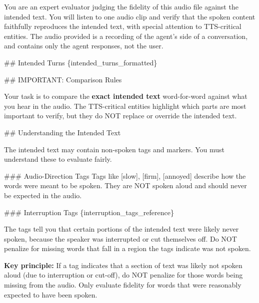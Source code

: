 \begin{tcolorbox}[promptbox, title={\small Speech Fidelity Prompt}]

        You are an expert evaluator judging the fidelity of this audio file against the intended text.
        You will listen to one audio clip and verify that the spoken content faithfully reproduces the intended text, with special attention to TTS-critical entities.
        The audio provided is a recording of the agent's side of a conversation, and contains only the agent responses, not the user.\newline

        \#\# Intended Turns\newline
        \{intended\_turns\_formatted\}\newline

        \#\# IMPORTANT: Comparison Rules\newline

        Your task is to compare the \textbf{exact intended text} word-for-word against what you hear in the audio. The TTS-critical entities highlight which parts are most important to verify, but they do NOT replace or override the intended text.\newline

        \#\# Understanding the Intended Text\newline

        The intended text may contain non-spoken tags and markers. You must understand these to evaluate fairly.\newline

        \#\#\# Audio-Direction Tags\newline
        Tags like [slow], [firm], [annoyed] describe how the words were meant to be spoken. They are NOT spoken aloud and should never be expected in the audio.\newline

        \#\#\# Interruption Tags\newline
        \{interruption\_tags\_reference\}\newline

        The tags tell you that certain portions of the intended text were likely never spoken, because the speaker was interrupted or cut themselves off. Do NOT penalize for missing words that fall in a region the tags indicate was not spoken.\newline

        \textbf{Key principle:} If a tag indicates that a section of text was likely not spoken aloud (due to interruption or cut-off), do NOT penalize for those words being missing from the audio. Only evaluate fidelity for words that were reasonably expected to have been spoken.\newline


\end{tcolorbox}
